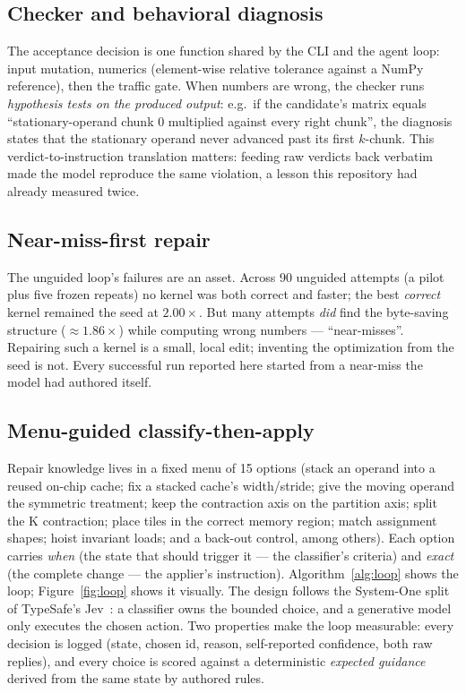 \documentclass[10pt]{article}
\begin{document}
\subsection{Checker and behavioral diagnosis}
The acceptance decision is one function shared by the CLI and the agent loop: input mutation,
numerics (element-wise relative tolerance against a NumPy reference), then the traffic gate. When
numbers are wrong, the checker runs \emph{hypothesis tests on the produced output}: e.g.\ if the
candidate's matrix equals ``stationary-operand chunk 0 multiplied against every right chunk'', the
diagnosis states that the stationary operand never advanced past its first $k$-chunk. This
verdict-to-instruction translation matters: feeding raw verdicts back verbatim made the model
reproduce the same violation, a lesson this repository had already measured twice.

\subsection{Near-miss-first repair}
The unguided loop's failures are an asset. Across 90 unguided attempts (a pilot plus five frozen
repeats) no kernel was both correct and faster; the best \emph{correct} kernel remained the seed at
$2.00\times$. But many attempts \emph{did} find the byte-saving structure ($\approx1.86\times$)
while computing wrong numbers --- ``near-misses''. Repairing such a kernel is a small, local edit;
inventing the optimization from the seed is not. Every successful run reported here started from a
near-miss the model had authored itself.

\subsection{Menu-guided classify-then-apply}
Repair knowledge lives in a fixed menu of 15 options (stack an operand into a reused on-chip cache;
fix a stacked cache's width/stride; give the moving operand the symmetric treatment; keep the
contraction axis on the partition axis; split the K contraction; place tiles in the correct memory
region; match assignment shapes; hoist invariant loads; and a back-out control, among others).
Each option carries \emph{when} (the state that should trigger it --- the classifier's criteria)
and \emph{exact} (the complete change --- the applier's instruction). Algorithm~\ref{alg:loop}
shows the loop; Figure~\ref{fig:loop} shows it visually. The design follows the System-One split
of TypeSafe's Jev~\cite{jev}: a classifier owns the bounded choice, and a generative model only
executes the chosen action. Two properties make the loop measurable: every decision is logged
(state, chosen id, reason, self-reported confidence, both raw replies), and every choice is scored
against a deterministic \emph{expected guidance} derived from the same state by authored rules.
\end{document}
